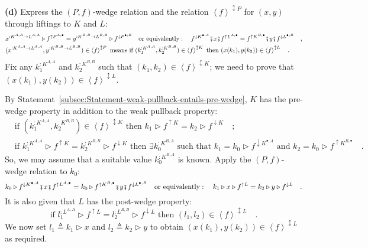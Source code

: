 \textbf{(d)} Express the $\left(P,f\right)$-wedge relation and the
relation $\left<f\right>^{\updownarrow P}$ for $(x,y)$ through liftings
to $K$ and $L$:
\begin{align*}
 & x^{:K^{A,A}\rightarrow L^{A,A}}\triangleright f^{\uparrow P^{A,\bullet}}=y^{:K^{B,B}\rightarrow L^{B,B}}\triangleright f^{\downarrow P^{\bullet,B}}\quad\text{or equivalently}:\quad f^{\downarrow K^{\bullet,A}}\bef x\bef f^{\uparrow L^{A,\bullet}}=f^{\uparrow K^{B,\bullet}}\bef y\bef f^{\downarrow L^{\bullet,B}}\quad,\\
 & (x^{:K^{A,A}\rightarrow L^{A,A}},y^{:K^{B,B}\rightarrow L^{B,B}})\in\left<f\right>^{\updownarrow P}\text{ means if }(k_{1}^{:K^{A,A}},k_{2}^{:K^{B,B}})\in\left<f\right>^{\updownarrow K}\text{ then }(x(k_{1}),y(k_{2}))\in\left<f\right>^{\updownarrow L}\quad.
\end{align*}
Fix any $k_{1}^{:K^{A,A}}$ and $k_{2}^{:K^{B,B}}$ such that $(k_{1},k_{2})\in\left<f\right>^{\updownarrow K}$;
we need to prove that $(x(k_{1}),y(k_{2}))\in\left<f\right>^{\updownarrow L}$.

By Statement~\ref{subsec:Statement-weak-pullback-entails-pre-wedge},
$K$ has the pre-wedge property in addition to the weak pullback property:
\begin{align*}
 & \text{if }(k_{1}^{:K^{A,A}},k_{2}^{:K^{B,B}})\in\left<f\right>^{\updownarrow K}\text{ then }k_{1}\triangleright f^{\uparrow K}=k_{2}\triangleright f^{\downarrow K}\quad;\\
 & \text{if }k_{1}^{:K^{A,A}}\triangleright f^{\uparrow K}=k_{2}^{:K^{B,B}}\triangleright f^{\downarrow K}\text{ then }\exists k_{0}^{:K^{B,A}}\text{ such that }k_{1}=k_{0}\triangleright f^{\downarrow K^{\bullet,A}}\text{ and }k_{2}=k_{0}\triangleright f^{\uparrow K^{B,\bullet}}\quad.
\end{align*}
So, we may assume that a suitable value $k_{0}^{:K^{B,A}}$ is known.
Apply the $\left(P,f\right)$-wedge relation to $k_{0}$:
\[
k_{0}\triangleright f^{\downarrow K^{\bullet,A}}\bef x\bef f^{\uparrow L^{A,\bullet}}=k_{0}\triangleright f^{\uparrow K^{B,\bullet}}\bef y\bef f^{\downarrow L^{\bullet,B}}\quad\text{or equivalently}:\quad k_{1}\triangleright x\triangleright f^{\uparrow L}=k_{2}\triangleright y\triangleright f^{\downarrow L}\quad.
\]
 It is also given that $L$ has the post-wedge property:
\[
\text{if }l_{1}^{:L^{A,A}}\triangleright f^{\uparrow L}=l_{2}^{:L^{B,B}}\triangleright f^{\downarrow L}\text{ then }(l_{1},l_{2})\in\left<f\right>^{\updownarrow L}\quad.
\]
We now set $l_{1}\triangleq k_{1}\triangleright x$ and $l_{2}\triangleq k_{2}\triangleright y$
to obtain $(x(k_{1}),y(k_{2}))\in\left<f\right>^{\updownarrow L}$
as required.

